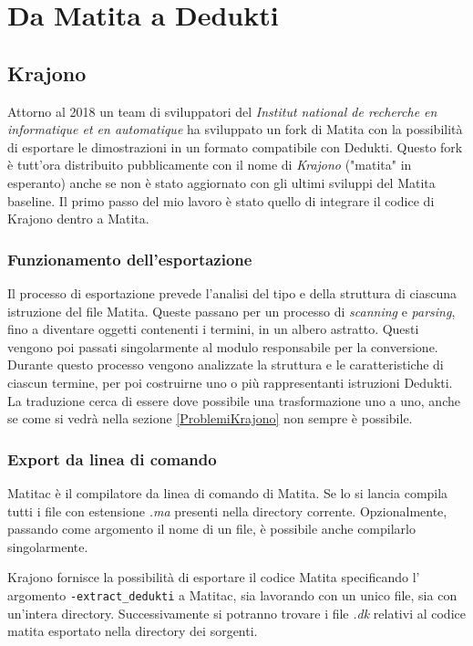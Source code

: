 \documentclass[12pt,a4paper]{report}
\begin{document}
\chapter{Da Matita a Dedukti} \label{capitoloExport}
\section{Krajono}
Attorno al 2018 un team di sviluppatori del 
\textit{Institut national de recherche
en informatique et en automatique} %
ha sviluppato un fork di Matita con la possibilità di esportare le dimostrazioni
in un formato compatibile con Dedukti. Questo fork è tutt'ora distribuito 
pubblicamente con il nome di \textit{Krajono} ("matita" in esperanto) anche se 
non è stato aggiornato con gli ultimi sviluppi del Matita baseline.
Il primo passo del mio lavoro è stato quello di integrare il codice di Krajono
dentro a Matita.

\subsection{Funzionamento dell'esportazione}
Il processo di esportazione prevede l'analisi del tipo e della struttura di 
ciascuna istruzione del file Matita. Queste passano per un processo di 
\textit{scanning} e \textit{parsing}, fino a diventare oggetti contenenti i
termini, in un albero astratto. Questi vengono poi passati singolarmente al
modulo responsabile per la conversione. Durante questo processo vengono
analizzate la struttura e le caratteristiche di ciascun termine, per poi
costruirne uno o più rappresentanti istruzioni Dedukti. La traduzione cerca 
di essere dove possibile una trasformazione uno a uno, anche se come si vedrà
nella sezione \ref{ProblemiKrajono} non sempre è possibile.

\subsection{Export da linea di comando}
Matitac è il compilatore da linea di comando di Matita. Se lo si lancia compila
tutti i file con estensione \textit{.ma} presenti nella directory corrente. 
Opzionalmente, passando come argomento il nome di un file, è possibile anche 
compilarlo singolarmente. 

Krajono fornisce la possibilità di esportare il codice Matita specificando l'
argomento \texttt{-extract\_dedukti} a Matitac, sia lavorando con un unico file,
sia con un'intera directory. Successivamente si potranno trovare i file \textit{.dk} 
relativi al codice matita esportato nella directory dei sorgenti.
\end{document}
